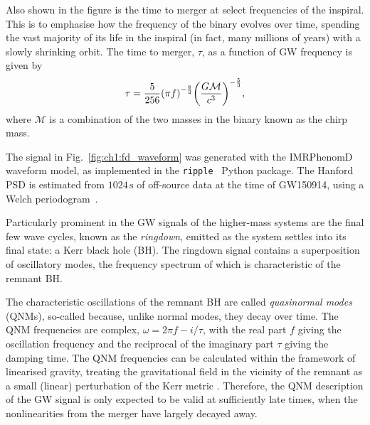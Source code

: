 Also shown in the figure is the time to merger at select frequencies of the inspiral.
This is to emphasise how the frequency of the binary evolves over time, spending the vast majority of its life in the inspiral (in fact, many millions of years) with a slowly shrinking orbit.
The time to merger, $\tau$, as a function of GW frequency is given by
\begin{equation}\label{eq:time_to_merger}
    \tau = \frac{5}{256} \qty(\pi f)^{-\frac{8}{3}} \qty(\frac{G\mathcal{M}}{c^3})^{-\frac{5}{3}},
\end{equation}
where $\mathcal{M}$ is a combination of the two masses in the binary known as the chirp mass.

The signal in Fig.~\ref{fig:ch1:fd_waveform} was generated with the IMRPhenomD~\cite{Khan:2015jqa} waveform model, as implemented in the \texttt{ripple}~\cite{Edwards:2023sak} Python package.
The Hanford PSD is estimated from $1024\,\mathrm{s}$ of off-source data at the time of GW150914, using a Welch periodogram~\cite{1161901}.


Particularly prominent in the GW signals of the higher-mass systems are the final few wave cycles, known as the \emph{ringdown}, emitted as the system settles into its final state: a Kerr black hole (BH). 
The ringdown signal contains a superposition of oscillatory modes, the frequency spectrum of which is characteristic of the remnant BH.

The characteristic oscillations of the remnant BH are called \emph{quasinormal modes} (QNMs), so-called because, unlike normal modes, they decay over time.
The QNM frequencies are complex, $\omega = 2\pi f - {i}/\tau$, with the real part $f$ giving the oscillation frequency and the reciprocal of the imaginary part $\tau$ giving the damping time. 
The QNM frequencies can be calculated within the framework of linearised gravity, treating the gravitational field in the vicinity of the remnant as a small (linear) perturbation of the Kerr metric \cite{Berti:2009kk}.
Therefore, the QNM description of the GW signal is only expected to be valid at sufficiently late times, when the nonlinearities from the merger have largely decayed away. 

